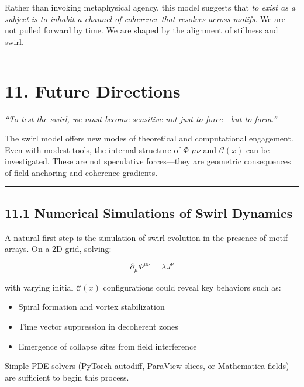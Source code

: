 \documentclass[
  11pt,
]{article}
\providecommand{\tightlist}{%
  \setlength{\itemsep}{0pt}\setlength{\parskip}{0pt}}
\begin{document}
Rather than invoking metaphysical agency, this model suggests that
\emph{to exist as a subject is to inhabit a channel of coherence that
resolves across motifs.} We are not pulled forward by time. We are
shaped by the alignment of stillness and swirl.

\begin{center}\rule{0.5\linewidth}{0.5pt}\end{center}

\section{11. Future Directions}\label{future-directions}

\emph{``To test the swirl, we must become sensitive not just to
force---but to form.''}

The swirl model offers new modes of theoretical and computational
engagement. Even with modest tools, the internal structure of
\(\Phi\_{\mu\nu}\) and \(\mathcal{C}(x)\) can be investigated. These are
not speculative forces---they are geometric consequences of field
anchoring and coherence gradients.

\begin{center}\rule{0.5\linewidth}{0.5pt}\end{center}

\subsection{11.1 Numerical Simulations of Swirl
Dynamics}\label{numerical-simulations-of-swirl-dynamics}

A natural first step is the simulation of swirl evolution in the
presence of motif arrays. On a 2D grid, solving:

\[
\partial_\mu \Phi^{\mu\nu} = \lambda J^\nu
\]

with varying initial \(\mathcal{C}(x)\) configurations could reveal key
behaviors such as:

\begin{itemize}
\tightlist
\item
  Spiral formation and vortex stabilization
\item
  Time vector suppression in decoherent zones
\item
  Emergence of collapse sites from field interference
\end{itemize}

Simple PDE solvers (PyTorch autodiff, ParaView slices, or Mathematica
fields) are sufficient to begin this process.
\end{document}
